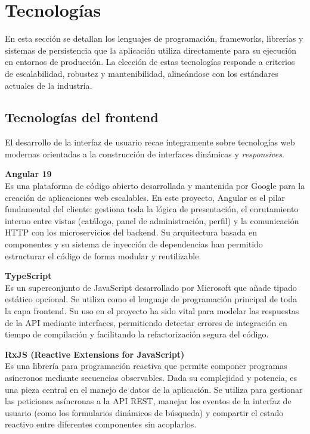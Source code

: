 \section{Tecnologías}
\label{sec:tecnologias}

    En esta sección se detallan los lenguajes de programación, frameworks, librerías y sistemas de persistencia que la aplicación utiliza directamente para su ejecución en entornos de producción. La elección de estas tecnologías responde a criterios de escalabilidad, robustez y mantenibilidad, alineándose con los estándares actuales de la industria.

    \subsection{Tecnologías del frontend}
    
        El desarrollo de la interfaz de usuario recae íntegramente sobre tecnologías web modernas orientadas a la construcción de interfaces dinámicas y \textit{responsives}.
        
        \textbf{Angular 19} ~\cite{AngularDocs} \\
        Es una plataforma de código abierto desarrollada y mantenida por Google para la creación de aplicaciones web escalables. En este proyecto, Angular es el pilar fundamental del cliente: gestiona toda la lógica de presentación, el enrutamiento interno entre vistas (catálogo, panel de administración, perfil) y la comunicación HTTP con los microservicios del backend. Su arquitectura basada en componentes y su sistema de inyección de dependencias han permitido estructurar el código de forma modular y reutilizable.
        
        \textbf{TypeScript} ~\cite{TypeScript2014} \\
        Es un superconjunto de JavaScript desarrollado por Microsoft que añade tipado estático opcional. Se utiliza como el lenguaje de programación principal de toda la capa frontend. Su uso en el proyecto ha sido vital para modelar las respuestas de la API mediante interfaces, permitiendo detectar errores de integración en tiempo de compilación y facilitando la refactorización segura del código.
        
        \textbf{RxJS (Reactive Extensions for JavaScript)} ~\cite{RxJS} \\
        Es una librería para programación reactiva que permite componer programas asíncronos mediante secuencias observables. Dada su complejidad y potencia, es una pieza central en el manejo de datos de la aplicación. Se utiliza para gestionar las peticiones asíncronas a la API REST, manejar los eventos de la interfaz de usuario (como los formularios dinámicos de búsqueda) y compartir el estado reactivo entre diferentes componentes sin acoplarlos.
        
